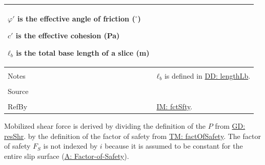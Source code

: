 \documentclass[12pt]{article}
\begin{document}
\begin{minipage}{\textwidth}
\begin{tabular}{p{} p{}}
\begin{symbDescription}
                                         \item{$φ'$ is the effective angle of friction (${}^{\circ}$)}
                                         \item{$c'$ is the effective cohesion (Pa)}
                                         \item{${ℓ_{b}}$ is the total base length of a slice (m)}
                                         \end{symbDescription}
                                         \\ \midrule \\
                                         Notes & ${ℓ_{b}}$ is defined in \hyperref[DD:lengthLb]{DD: lengthLb}.
                                                 \\ \midrule \\
                                                 Source & \cite{chen2005}
                                                          \\ \midrule \\
                                                          RefBy & \hyperref[IM:fctSfty]{IM: fctSfty}.
\\ \bottomrule \end{tabular}
\end{minipage}
Mobilized shear force is derived by dividing the definition of the $P$ from \hyperref[GD:resShr]{GD: resShr}. by the definition of the factor of safety from \hyperref[TM:factOfSafety]{TM: factOfSafety}. The factor of safety ${F_{S}}$ is not indexed by $i$ because it is assumed to be constant for the entire slip surface (\hyperref[assumpFOS]{A: Factor-of-Safety}).
\par~
\end{document}
